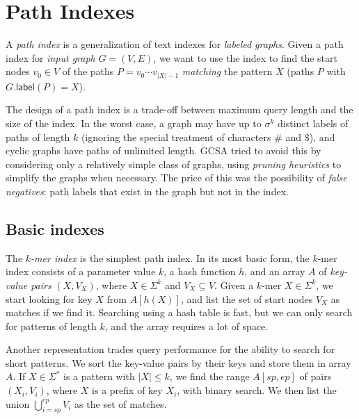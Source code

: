 \documentclass[a4paper,11pt]{llncs}
\newcommand{\abs}[1]{\ensuremath{\lvert #1 \rvert}}
\newcommand{\glabel}{\ensuremath{\mathsf{label}}}
\newcommand{\kmer}[1]{$#1$\nobreakdash-mer}
\begin{document}
\section{Path Indexes}\label{sect:path-indexes}

A \emph{path index} is a generalization of text indexes for \emph{labeled graphs}. Given a path index for \emph{input graph} $G = (V, E)$, we want to use the index to find the start nodes $v_{0} \in V$ of the paths $P = v_{0} \dotsm v_{\abs{X}-1}$ \emph{matching} the pattern $X$ (paths $P$ with $G.\glabel(P) = X$).

The design of a path index is a trade-off between maximum query length and the size of the index. In the worst case, a graph may have up to $\sigma^{k}$ distinct labels of paths of length $k$ (ignoring the special treatment of characters $\#$ and $\$$), and cyclic graphs have paths of unlimited length. GCSA \cite{Siren2014} tried to avoid this by considering only a relatively simple class of graphs, using \emph{pruning heuristics} to simplify the graphs when necessary. The price of this was the possibility of \emph{false negatives}: path labels that exist in the graph but not in the index.

\subsection{Basic indexes}

The \emph{\kmer{k} index} is the simplest path index. In its most basic form, the \kmer{k} index consists of a parameter value $k$, a hash function $h$, and an array $A$ of \emph{key-value pairs} $(X, V_{X})$, where $X \in \Sigma^{k}$ and $V_{X} \subseteq V$. Given a \kmer{k} $X \in \Sigma^{k}$, we start looking for key $X$ from $A[h(X)]$, and list the set of start nodes $V_{X}$ as matches if we find it. Searching using a hash table is fast, but we can only search for patterns of length $k$, and the array requires a lot of space.

Another representation trades query performance for the ability to search for short patterns. We sort the key-value pairs by their keys and store them in array $A$. If $X \in \Sigma^{\ast}$ is a pattern with $\abs{X} \le k$, we find the range $A[sp, ep]$ of pairs $(X_{i}, V_{i})$, where $X$ is a prefix of key $X_{i}$, with binary search. We then list the union $\bigcup_{i=sp}^{ep} V_{i}$ as the set of matches.
\end{document}
